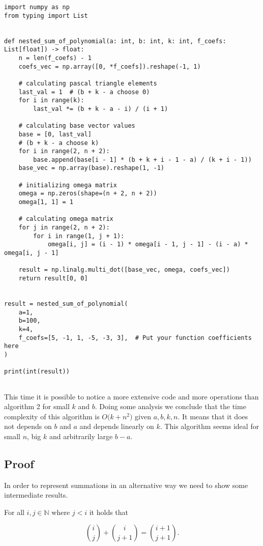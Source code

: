 \documentclass[12pt]{article}
\begin{document}
\begin{lstlisting}[style=Python]
import numpy as np
from typing import List


def nested_sum_of_polynomial(a: int, b: int, k: int, f_coefs: List[float]) -> float:
    n = len(f_coefs) - 1
    coefs_vec = np.array([0, *f_coefs]).reshape(-1, 1)

    # calculating pascal triangle elements
    last_val = 1  # (b + k - a choose 0)
    for i in range(k):
        last_val *= (b + k - a - i) / (i + 1)

    # calculating base vector values
    base = [0, last_val]
    # (b + k - a choose k)
    for i in range(2, n + 2):
        base.append(base[i - 1] * (b + k + i - 1 - a) / (k + i - 1))
    base_vec = np.array(base).reshape(1, -1)

    # initializing omega matrix
    omega = np.zeros(shape=(n + 2, n + 2))
    omega[1, 1] = 1

    # calculating omega matrix
    for j in range(2, n + 2):
        for i in range(1, j + 1):
            omega[i, j] = (i - 1) * omega[i - 1, j - 1] - (i - a) * omega[i, j - 1]

    result = np.linalg.multi_dot([base_vec, omega, coefs_vec])
    return result[0, 0]


result = nested_sum_of_polynomial(
    a=1,
    b=100,
    k=4,
    f_coefs=[5, -1, 1, -5, -3, 3],  # Put your function coefficients here
)

print(int(result))
    
\end{lstlisting}

This time it is possible to notice a more extensive code and more operations than algorithm 2 for small $k$ and $b$. Doing some analysis we conclude that the time complexity of this algorithm is $O\Big(k + n^2\Big)$ given $a, b, k, n$. It means that it does not depends on $b$ and $a$ and depends linearly on $k$. This algorithm seems ideal for small $n$, big $k$ and arbitrarily large $b - a$.

\subsection{Proof}

In order to represent summations in an alternative way we need to show some intermediate results.

\begin{theorem}
    \label{pascal_rule}

    For all $i, j \in \mathbb{N}$ where $j < i$ it holds that

    $$
        \binom{i}{j} + \binom{i}{j+1} = \binom{i+1}{j+1}.
    $$

\end{theorem}
\end{document}

